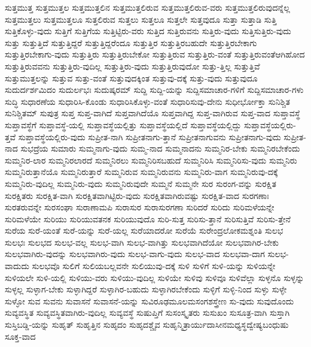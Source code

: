 {ಸುತ್ತಮುತ್ತ
ಸುತ್ತಮುತ್ತಲ
ಸುತ್ತಮುತ್ತಲಿನ
ಸುತ್ತಮುತ್ತಲಿರುವ
ಸುತ್ತಮುತ್ತಲಿರುವ-ವರು
ಸುತ್ತಮುತ್ತಲಿರುವುದನ್ನೆಲ್ಲ
ಸುತ್ತಮುತ್ತಲು
ಸುತ್ತಮುತ್ತಲೂ
ಸುತ್ತಲಿರುವ
ಸುತ್ತಲು
ಸುತ್ತಲೂ
ಸುತ್ತಲೇ
ಸುತ್ತವುದೂ
ಸುತ್ತಾ
ಸುತ್ತಾಡಿ
ಸುತ್ತಿ
ಸುತ್ತಿಕೊಳ್ಳು-ವುದು
ಸುತ್ತಿಗೆ
ಸುತ್ತಿಗೆಯ
ಸುತ್ತಿಟ್ಟಿರು-ವರು
ಸುತ್ತಿದ
ಸುತ್ತಿರುವನು
ಸುತ್ತಿರು-ವುದು
ಸುತ್ತಿಸುತ್ತಿರು-ವುದು
ಸುತ್ತು
ಸುತ್ತುತ್ತಿದೆ
ಸುತ್ತುತ್ತಿದ್ದರೆ
ಸುತ್ತುತ್ತಿದ್ದರೆಂದೂ
ಸುತ್ತುತ್ತಿರ
ಸುತ್ತುತ್ತಿರಬಹುದೇ
ಸುತ್ತುತ್ತಿರಬೇಕಾಗು
ಸುತ್ತುತ್ತಿರಬೇಕಾಗು-ವುದು
ಸುತ್ತುತ್ತಿರು
ಸುತ್ತುತ್ತಿರುಬೇಕೋ
ಸುತ್ತುತ್ತಿರುವ
ಸುತ್ತುತ್ತಿರು-ವಂತೆ
ಸುತ್ತುತ್ತಿರುವಂತೆಆಗಿಹೋದ
ಸುತ್ತುತ್ತಿರುವವನು
ಸುತ್ತುತ್ತಿರು-ವುದಿಲ್ಲ
ಸುತ್ತುತ್ತಿರು-ವುದು
ಸುತ್ತುತ್ತಿರುವುದೋ
ಸುತ್ತು-ತ್ತಿಲ್ಲ
ಸುತ್ತುತ್ತಿವೆ
ಸುತ್ತುಮುತ್ತಲನ್ನು
ಸುತ್ತುವ
ಸುತ್ತು-ವಂತೆ
ಸುತ್ತುವುದಕ್ಕಿಂತ
ಸುತ್ತುವು-ದಕ್ಕೆ
ಸುತ್ತು-ವುದು
ಸುತ್ತುವುದೂ
ಸುದುರ್ದರ್ಶಮಿದಂ
ಸುದುರ್ಲಭಃ
ಸುದುಷ್ಕರಮ್
ಸುದ್ದಿ
ಸುದ್ದಿ-ಯನ್ನು
ಸುದ್ದಿಸಮಾಚಾರ-ಗಳಿಗೆ
ಸುದ್ದಿಸಮಾಚಾರ-ಗಳು
ಸುದ್ಧಿ
ಸುಧಾರಣೆಯ
ಸುಧಾರಿಸಿ-ಕೊಂಡು
ಸುಧಾರಿಸಿಕೊಳ್ಳು-ವಂತೆ
ಸುಧಾರಿಸುವು-ದೇನು
ಸುಧೀರ್ಭೋಕ್ತಾ
ಸುನಿಶ್ಚಿತ
ಸುನಿಶ್ಚಿತಮ್
ಸುಪುತ್ರ
ಸುಪ್ತ
ಸುಪ್ತ-ವಾಗಿದೆ
ಸುಪ್ತವಾಗಿದೆಯೊ
ಸುಪ್ತವಾಗಿದ್ದ
ಸುಪ್ತ-ವಾಗಿರುವ
ಸುಪ್ತ-ವಾದ
ಸುಪ್ತಾವಸ್ಥೆ
ಸುಪ್ತಾವಸ್ಥೆಗೆ
ಸುಪ್ತಾವಸ್ಥೆ-ಯಲ್ಲಿ
ಸುಪ್ತಾವಸ್ಥೆಯಲ್ಲಿತ್ತು
ಸುಪ್ತಾವಸ್ಥೆಯಲ್ಲಿದೆ
ಸುಪ್ತಾವಸ್ಥೆಯಲ್ಲಿದ್ದು
ಸುಪ್ತಾವಸ್ಥೆಯಲ್ಲಿರು-ತ್ತವೆ
ಸುಪ್ತಾವಸ್ಥೆಯಲ್ಲಿರು-ವುದು
ಸುಪ್ರೀತ-ನಾಗಿ
ಸುಪ್ರೀತನಾಗು-ತ್ತಾನೆ
ಸುಪ್ರೀತನಾಗುವನು
ಸುಪ್ರೀತನಾಗು-ವುದು
ಸುಪ್ರೀತ-ನಾದ
ಸುಭದ್ರೆಯ
ಸುಮಾರು
ಸುಮ್ಮನಾಗು-ವುದು
ಸುಮ್ಮ-ನಾದ
ಸುಮ್ಮನಾದನು
ಸುಮ್ಮನಿರ-ಬೇಕು
ಸುಮ್ಮನಿರಬೇಕೆಂದು
ಸುಮ್ಮನಿರ-ಲಾರ
ಸುಮ್ಮನಿರಲಾರದೆ
ಸುಮ್ಮನಿರಲು
ಸುಮ್ಮನಿರಿಸಬಹುದೆ
ಸುಮ್ಮನಿರಿಸಿ
ಸುಮ್ಮನಿರಿಸು-ವುದು
ಸುಮ್ಮನಿರು
ಸುಮ್ಮನಿರುತ್ತಾನೆಯೊ
ಸುಮ್ಮನಿರುತ್ತಾರೆ
ಸುಮ್ಮನಿರುವ
ಸುಮ್ಮನಿರುವನು
ಸುಮ್ಮನಿರು-ವಾಗ
ಸುಮ್ಮನಿರುವು-ದಕ್ಕೆ
ಸುಮ್ಮನಿರು-ವುದಿಲ್ಲ
ಸುಮ್ಮನಿರು-ವುದು
ಸುಮ್ಮನಿರುವುದೇ
ಸುಮ್ಮನೆ
ಸುಮ್ಮನೇ
ಸುರ
ಸುರಂಗ-ವನ್ನು
ಸುರಕ್ಷಿತ
ಸುರಕ್ಷಿತರು
ಸುರಕ್ಷಿತ-ವಾಗಿ
ಸುರಕ್ಷಿತವಾಗಿಟ್ಟಿರು-ವುದು
ಸುರಕ್ಷಿತವಾಗಿರುವಷ್ಟು
ಸುರಕ್ಷಿತ-ವಾದ
ಸುರಗಣಾಃ
ಸುರತರುವನ್ನೇ
ಸುರಸಂಘಾ
ಸುರಾಣಾಮಪಿ
ಸುರಾಸುರ
ಸುರಾಸುರಗಣಾ
ಸುರಿದರೆ
ಸುರಿದು
ಸುರಿಮಳೆಯನ್ನೇ
ಸುರಿಮಳೆಯೇ
ಸುರಿಯು
ಸುರಿಯುವತನಕ
ಸುರಿಯುವುದೊ
ಸುರಿ-ಸುತ್ತ
ಸುರಿಸು-ತ್ತಾನೆ
ಸುರಿಸುತ್ತಿವೆ
ಸುರಿಸು-ತ್ತೇನೆ
ಸುರೆಯ
ಸುರೆ-ಯಂತೆ
ಸುರೆ-ಯನ್ನು
ಸುರೆ-ಯಲ್ಲ
ಸುರೆಯಾದರೋ
ಸುರೆಯೆ
ಸುರೇಂದ್ರಲೋಕಮಶ್ನಂತಿ
ಸುಲಭ
ಸುಲಭಃ
ಸುಲಭದ
ಸುಲಭ-ವಲ್ಲ
ಸುಲಭ-ವಾಗಿ
ಸುಲಭ-ವಾಗಿತ್ತು
ಸುಲಭವಾಗಿದೆಯೋ
ಸುಲಭವಾಗಿರ-ಬೇಕು
ಸುಲಭವಾಗಿರು-ವುದನ್ನು
ಸುಲಭವಾಗಿರು-ವುದು
ಸುಲಭ-ವಾಗು-ವುದು
ಸುಲಭ-ವಾದ
ಸುಲಭವಾ-ದಾಗ
ಸುಲಭ-ವಾದುದು
ಸುಲಭವೊ
ಸುಲಿಗೆ
ಸುಲಿಯಬಲ್ಲವನೇ
ಸುಲಿಯುವು-ದಕ್ಕೆ
ಸುಳಿ
ಸುಳಿಗೆ
ಸುಳಿ-ಯನ್ನು
ಸುಳಿಯನ್ನೇ
ಸುಳಿಯಲೇ
ಸುಳಿ-ಯಲ್ಲಿ
ಸುಳಿಯು-ವರು
ಸುಳಿಯು-ವುದಿಲ್ಲ
ಸುಳಿಯೇ
ಸುಳಿವು
ಸುಳಿವೂ
ಸುಳಿವೆಲ್ಲಾ
ಸುಳ್ಳನೊ
ಸುಳ್ಳನ್ನು
ಸುಳ್ಳಲ್ಲ
ಸುಳ್ಳಾಗ-ಬೇಕು
ಸುಳ್ಳಾಗಿದ್ದರೆ
ಸುಳ್ಳಾಗಿರ-ಬಹುದು
ಸುಳ್ಳಾಗಿರಬೇಕೆಂದು
ಸುಳ್ಳಿಗೆ
ಸುಳ್ಳಿ-ನಿಂದ
ಸುಳ್ಳು
ಸುಳ್ಳೇ
ಸುಳ್ಳೋ
ಸುವ
ಸುವನು
ಸುವಾಸನೆ
ಸುವಾಸನೆ-ಯನ್ನು
ಸುವಿರೂಢಮೂಲಮಸಂಗಶಸ್ತ್ರೇಣ
ಸು-ವುದು
ಸುವುದೊಂದು
ಸುವ್ಯವಸ್ಥಿತ
ಸುವ್ಯವಸ್ಥಿತವಾಗಿರು-ವುದಿಲ್ಲ
ಸುವ್ಯವಸ್ಥೆ
ಸುಷುಪ್ತಿಗೆ
ಸುಸಂಸ್ಕೃತರು
ಸುಸುಖಂ
ಸುಸೂತ್ರ-ವಾಗಿ
ಸುಸ್ತಾಗಿ
ಸುಸ್ತಿಬಡ್ಡಿ-ಯನ್ನು
ಸುಹೃತ್
ಸುಹೃತ್ತಿನ
ಸುಹೃದಂ
ಸುಹೃದಶ್ಚೈವ
ಸುಹೃನ್ಮಿತ್ರಾರ್ಯುದಾಸೀನಮಧ್ಯಸ್ಥದ್ವೇಷ್ಯಬಂಧುಷು
ಸೂಕ್ತ-ವಾದ
}
